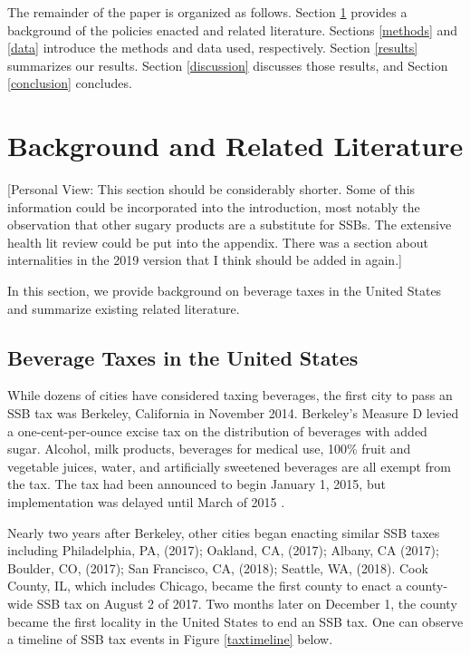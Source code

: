 \documentclass[12pt]{article}
\begin{document}
The remainder of the paper is organized as follows. Section \ref{background} provides a background of the policies enacted and related literature. Sections \ref{methods} and \ref{data} introduce the methods and data used, respectively. Section \ref{results} summarizes our results. Section \ref{discussion} discusses those results, and Section \ref{conclusion} concludes.

\section{Background and Related Literature} \label{background}

[Personal View: This section should be considerably shorter. Some of this information could be incorporated into the introduction, most notably the observation that other sugary products are a substitute for SSBs. The extensive health lit review could be put into the appendix. There was a section about internalities in the 2019 version that I think should be added in again.]

In this section, we provide background on beverage taxes in the United States and summarize existing related literature.

\subsection{Beverage Taxes in the United States}

While dozens of cities have considered taxing beverages, the first city to pass an SSB tax was Berkeley, California in November 2014. Berkeley's Measure D levied a one-cent-per-ounce excise tax on the distribution of beverages with added sugar. Alcohol, milk products, beverages for medical use, 100\% fruit and vegetable juices, water, and artificially sweetened beverages are all exempt from the tax. The tax had been announced to begin January 1, 2015, but implementation was delayed until March of 2015 \parencite{falbe2015higher}.

Nearly two years after Berkeley, other cities began enacting similar SSB taxes including Philadelphia, PA, (2017); Oakland, CA, (2017); Albany, CA (2017); Boulder, CO, (2017); San Francisco, CA, (2018); Seattle, WA, (2018). Cook County, IL, which includes Chicago, became the first county to enact a county-wide SSB tax on August 2 of 2017. Two months later on December 1, the county became the first locality in the United States to end an SSB tax. One can observe a timeline of SSB tax events in Figure \ref{taxtimeline} below.
\end{document}
